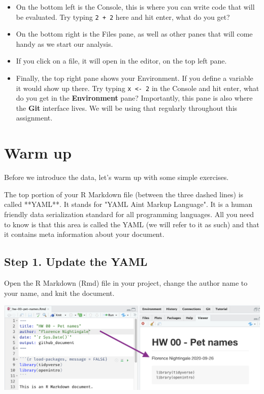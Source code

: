\documentclass[
]{article}
\newenvironment{Shaded}{\begin{snugshade}}{\end{snugshade}}
\newcommand{\NormalTok}[1]{#1}
\providecommand{\tightlist}{%
  \setlength{\itemsep}{0pt}\setlength{\parskip}{0pt}}
\begin{document}
\begin{itemize}
\tightlist
\item
  On the bottom left is the Console, this is where you can write code
  that will be evaluated. Try typing \texttt{2\ +\ 2} here and hit
  enter, what do you get?
\item
  On the bottom right is the Files pane, as well as other panes that
  will come handy as we start our analysis.
\item
  If you click on a file, it will open in the editor, on the top left
  pane.
\item
  Finally, the top right pane shows your Environment. If you define a
  variable it would show up there. Try typing
  \texttt{x\ \textless{}-\ 2} in the Console and hit enter, what do you
  get in the \textbf{Environment} pane? Importantly, this pane is also
  where the \textbf{Git} interface lives. We will be using that
  regularly throughout this assignment.
\end{itemize}

\section{Warm up}\label{warm-up}

Before we introduce the data, let's warm up with some simple exercises.

\begin{Shaded}
\begin{Highlighting}[]
\NormalTok{The top portion of your R Markdown file (between the three dashed lines) is called **YAML**. It stands for "YAML Ain\textquotesingle{}t Markup Language". It is a human friendly data serialization standard for all programming languages. All you need to know is that this area is called the YAML (we will refer to it as such) and that it contains meta information about your document.}
\end{Highlighting}
\end{Shaded}

\subsection{Step 1. Update the YAML}\label{step-1.-update-the-yaml}

Open the R Markdown (Rmd) file in your project, change the author name
to your name, and knit the document.

\begin{center}\includegraphics[width=0.8\linewidth]{img/yaml-raw-to-rendered} \end{center}
\end{document}
